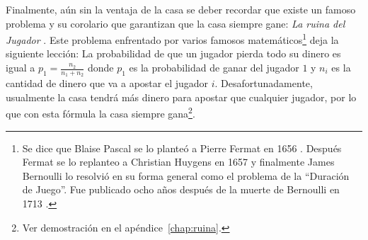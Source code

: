 \begin{table}[ht]
\centering
{}
\caption{Ventajas de la casa para juegos populares de casino \cite{hannum2005practical}}
\label{ventaja-casa}
\end{table}

Finalmente, aún sin la ventaja de la casa se deber recordar que existe un famoso problema y su corolario que garantizan que la casa siempre gane: \emph{La ruina del Jugador} \cite[p.~95-99]{ross2006first}. Este problema enfrentado por varios famosos matemáticos\footnote{Se dice que Blaise Pascal se lo planteó a Pierre Fermat en 1656 \cite{edwards1983pascal}. Después Fermat se lo replanteo a Christian Huygens en 1657 y finalmente James Bernoulli lo resolvió en su forma general como el problema de la ``Duración de Juego''. Fue publicado ocho años después de la muerte de Bernoulli en 1713 \cite[p.~98]{ross2006first}.} deja la siguiente lección: La probabilidad de que un jugador pierda todo su dinero es igual a  $p_1 = \frac{n_2}{n_1 + n_2}$ donde $p_1$ es la probabilidad de ganar del jugador $1$ y $n_i$ es la cantidad de dinero que va a apostar el jugador $i$. Desafortunadamente, usualmente la casa tendrá más dinero para apostar que cualquier jugador, por lo que con esta fórmula la casa siempre gana\footnote{Ver demostración en el apéndice~\ref{chap:ruina}.}.


